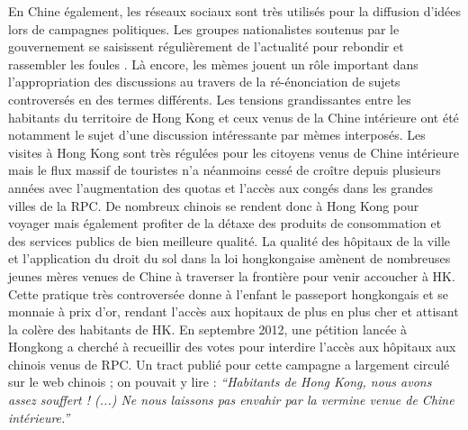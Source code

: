 \begin{description}
En Chine \'egalement, les r\'eseaux sociaux sont tr\`es utilis\'es pour la diffusion d{\textquoteright}id\'ees lors de campagnes politiques. Les groupes nationalistes soutenus par le gouvernement se saisissent r\'eguli\`erement de l{\textquoteright}actualit\'e pour rebondir et rassembler les foules \citep{Wu2007}. L\`a encore, les m\`emes jouent un r\^ole important dans l{\textquoteright}appropriation des discussions au travers de la r\'e-\'enonciation de sujets controvers\'es en des termes diff\'erents. Les tensions grandissantes entre les habitants du territoire de Hong Kong et ceux venus de la Chine int\'erieure ont \'et\'e notamment le sujet d{\textquoteright}une discussion int\'eressante par m\`emes interpos\'es. Les visites \`a Hong Kong sont tr\`es r\'egul\'ees pour les citoyens venus de Chine int\'erieure mais le flux massif de touristes n{\textquoteright}a n\'eanmoins cess\'e de cro\^itre depuis plusieurs ann\'ees avec l{\textquoteright}augmentation des quotas et l{\textquoteright}acc\`es aux cong\'es dans les grandes villes de la RPC. De nombreux chinois se rendent donc \`a Hong Kong pour voyager mais \'egalement profiter de la d\'etaxe des produits de consommation et des services publics de bien meilleure qualit\'e. La qualit\'e des h\^opitaux de la ville et l{\textquoteright}application du droit du sol dans la loi hongkongaise am\`enent de nombreuses jeunes m\`eres venues de Chine \`a traverser la fronti\`ere pour venir accoucher \`a HK. Cette pratique tr\`es controvers\'ee donne \`a l{\textquoteright}enfant le passeport hongkongais et se monnaie \`a prix d{\textquoteright}or, rendant l{\textquoteright}acc\`es aux hopitaux de plus en plus cher et attisant la col\`ere des habitants de HK. En septembre 2012, une p\'etition lanc\'ee \`a Hongkong a cherch\'e \`a recueillir des votes pour interdire l{\textquoteright}acc\`es aux h\^opitaux aux chinois venus de RPC. Un tract publi\'e pour cette campagne a largement circul\'e sur le web chinois ; on pouvait y lire :\textit{ {\textquotedblleft}Habitants de Hong Kong, nous avons assez souffert ! (...) Ne nous laissons pas envahir par la vermine venue de Chine int\'erieure.{\textquotedblright}}  


\end{description}
